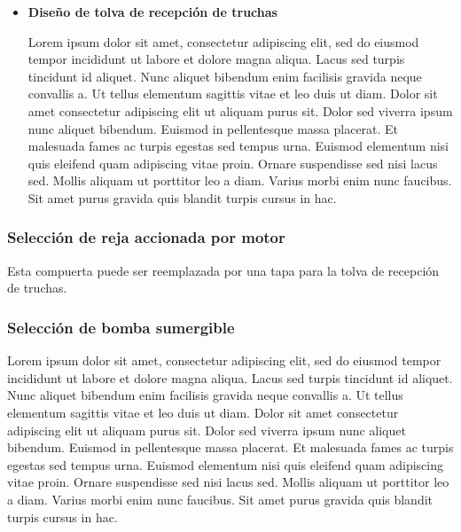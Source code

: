 \begin{itemize}
	
	\item \textbf{Diseño de tolva de recepción de truchas} 
	
	Lorem ipsum dolor sit amet, consectetur adipiscing elit, sed do eiusmod tempor incididunt ut labore et dolore magna aliqua. Lacus sed turpis tincidunt id aliquet. Nunc aliquet bibendum enim facilisis gravida neque convallis a. Ut tellus elementum sagittis vitae et leo duis ut diam. Dolor sit amet consectetur adipiscing elit ut aliquam purus sit. Dolor sed viverra ipsum nunc aliquet bibendum. Euismod in pellentesque massa placerat. Et malesuada fames ac turpis egestas sed tempus urna. Euismod elementum nisi quis eleifend quam adipiscing vitae proin. Ornare suspendisse sed nisi lacus sed. Mollis aliquam ut porttitor leo a diam. Varius morbi enim nunc faucibus. Sit amet purus gravida quis blandit turpis cursus in hac.
	
\end{itemize}



\subsubsection{Selección de reja accionada por motor}

Esta compuerta puede ser reemplazada por una tapa para la tolva de recepción de truchas. 

\subsubsection{Selección de bomba sumergible}

Lorem ipsum dolor sit amet, consectetur adipiscing elit, sed do eiusmod tempor incididunt ut labore et dolore magna aliqua. Lacus sed turpis tincidunt id aliquet. Nunc aliquet bibendum enim facilisis gravida neque convallis a. Ut tellus elementum sagittis vitae et leo duis ut diam. Dolor sit amet consectetur adipiscing elit ut aliquam purus sit. Dolor sed viverra ipsum nunc aliquet bibendum. Euismod in pellentesque massa placerat. Et malesuada fames ac turpis egestas sed tempus urna. Euismod elementum nisi quis eleifend quam adipiscing vitae proin. Ornare suspendisse sed nisi lacus sed. Mollis aliquam ut porttitor leo a diam. Varius morbi enim nunc faucibus. Sit amet purus gravida quis blandit turpis cursus in hac.



